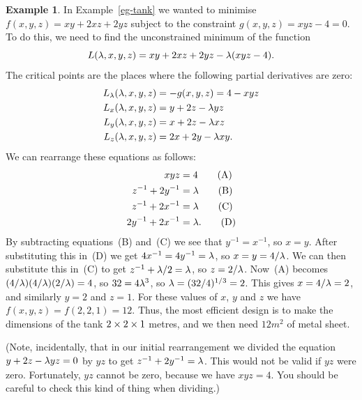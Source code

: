 \documentclass[reqno]{amsart}
\theoremstyle{definition}
\newtheorem{example}[theorem]{Example}
\begin{document}
\begin{example}\label{eg-tank-again}
 In Example~\ref{eg-tank} we wanted to minimise $f(x,y,z)=xy+2xz+2yz$
 subject to the constraint $g(x,y,z)=xyz-4=0$.  To do this, we need to
 find the unconstrained minimum of the function 
 \[ L(\lambda,x,y,z) = xy+2xz+2yz - \lambda(xyz-4). \]
 The critical points are the places where the following partial
 derivatives are zero:
 \begin{align*}
  L_\lambda(\lambda,x,y,z) &= -g(x,y,z) = 4-xyz \\
  L_x(\lambda,x,y,z)   &= y+2z-\lambda y z \\
  L_y(\lambda,x,y,z)   &= x+2z-\lambda x z \\
  L_z(\lambda,x,y,z)   &= 2x+2y-\lambda x y.
 \end{align*}
 We can rearrange these equations as follows:
 \begin{align*}
  xyz &= 4 \tag{A} \\
   z^{-1}+2y^{-1} &= \lambda  \tag{B} \\
   z^{-1}+2x^{-1} &= \lambda  \tag{C} \\
  2y^{-1}+2x^{-1} &= \lambda. \tag{D}
 \end{align*}
 By subtracting equations~(B) and~(C) we see that $y^{-1}=x^{-1}$, so
 $x=y$.  After substituting this in~(D) we get $4x^{-1}=4y^{-1}=\lambda$,
 so $x=y=4/\lambda$.  We can then substitute this in~(C) to get
 $z^{-1}+\lambda/2=\lambda$, so $z=2/\lambda$.  Now~(A) becomes
 $(4/\lambda)(4/\lambda)(2/\lambda)=4$, so $32=4\lambda^3$, so $\lambda=(32/4)^{1/3}=2$.
 This gives $x=4/\lambda=2$, and similarly $y=2$ and $z=1$.  For these
 values of $x$, $y$ and $z$ we have $f(x,y,z)=f(2,2,1)=12$.  Thus, the
 most efficient design is to make the dimensions of the tank
 $2\times 2\times 1$ metres, and we then need $12m^2$ of metal sheet.

 (Note, incidentally, that in our initial rearrangement we divided the
 equation $y+2z-\lambda yz=0$ by $yz$ to get $z^{-1}+2y^{-1}=\lambda$.  This
 would not be valid if $yz$ were zero.  Fortunately, $yz$ cannot be
 zero, because we have $xyz=4$.  You should be careful to check this
 kind of thing when dividing.)
\end{example}
\end{document}
